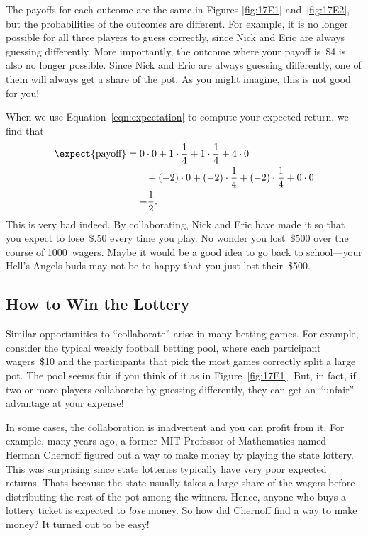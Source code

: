 The payoffs for each outcome are the same in Figures \ref{fig:17E1}
and~\ref{fig:17E2}, but the probabilities of the outcomes are
different.  For example, it is no longer possible for all three
players to guess correctly, since Nick and Eric are always guessing
differently.  More importantly, the outcome where your payoff is~\$4
is also no longer possible.  Since Nick and Eric are always guessing
differently, one of them will always get a share of the pot.  As you
might imagine, this is not good for you!

When we use Equation~\ref{eqn:expectation} to compute your expected
return, we find that
\begin{align*}
\expect{\text{payoff}}
    &= 0 \cdot 0 + 1 \cdot \frac{1}{4} + 1 \cdot \frac{1}{4}
        + 4 \cdot 0 \\
        & \qquad {}+ (-2) \cdot 0 + (-2) \cdot \frac{1}{4}
        + (-2) \cdot \frac{1}{4}
        + 0 \cdot 0 \\
    &= -\frac{1}{2}.
\end{align*}
This is very bad indeed.  By collaborating, Nick and Eric have made it
so that you expect to lose~\$.50 every time you play.  No wonder you
lost~\$500 over the course of 1000~wagers.  Maybe it would be a good
idea to go back to school---your Hell's Angels buds may not be to
happy that you just lost their~\$500.

\subsection{How to Win the Lottery}

Similar opportunities to ``collaborate'' arise in many betting games.
For example, consider the typical weekly football betting pool, where
each participant wagers~\$10 and the participants that pick the most
games correctly split a large pot.  The pool seems fair if you think
of it as in Figure~\ref{fig:17E1}.  But, in fact, if two or more
players collaborate by guessing differently, they can get an
``unfair'' advantage at your expense!

In some cases, the collaboration is inadvertent and you can profit
from it.  For example, many years ago, a former MIT Professor of
Mathematics named Herman Chernoff figured out a way to make money by
playing the state lottery.  This was surprising since state lotteries
typically have very poor expected returns.  Thats because the state
usually takes a large share of the wagers before distributing the rest
of the pot among the winners.  Hence, anyone who buys a lottery ticket
is expected to \emph{lose} money.  So how did Chernoff find a way to
make money?  It turned out to be easy!

